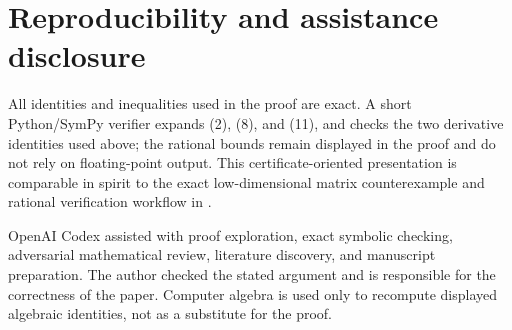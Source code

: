 \documentclass[11pt]{article}
\begin{document}
\section*{Reproducibility and assistance disclosure}

All identities and inequalities used in the proof are exact.  A short
Python/SymPy verifier expands (2), (8), and (11), and checks the two derivative
identities used above; the rational bounds remain displayed in the proof and
do not rely on floating-point output.  This certificate-oriented presentation
is comparable in spirit to the exact low-dimensional matrix counterexample
and rational verification workflow in \cite{ZengLiuRatnavelu2026}.

OpenAI Codex assisted with proof exploration, exact symbolic checking,
adversarial mathematical review, literature discovery, and manuscript
preparation.  The author checked the stated argument and is responsible for
the correctness of the paper.  Computer algebra is used only to recompute
displayed algebraic identities, not as a substitute for the proof.



\end{document}
